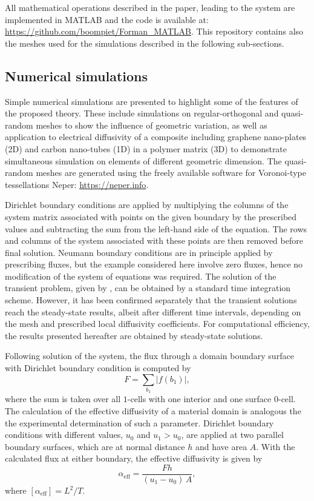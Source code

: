 \documentclass{elsarticle}
\theoremstyle{definition}
\newcommand{\abs}[1]{\left\lvert#1\right\rvert}
\begin{document}
All mathematical operations described in the paper, leading to the system  are implemented in MATLAB and the code is available at: \href{https://github.com/boompiet/Forman_MATLAB}{https://github.com/boompiet/Forman\_MATLAB}. This repository contains also the meshes used for the simulations described in the following sub-sections.

\subsection{Numerical simulations}

Simple numerical simulations are presented to highlight some of the features of the proposed theory. These include simulations on regular-orthogonal and quasi-random meshes to show the influence of geometric variation, as well as application to electrical diffusivity of a composite including graphene nano-plates (2D) and carbon nano-tubes (1D) in a polymer matrix (3D) to demonstrate simultaneous simulation on elements of different geometric dimension. The quasi-random meshes are generated using the freely available software for Voronoi-type tessellations Neper: \href{https://neper.info}{https://neper.info}.

Dirichlet boundary conditions are applied by multiplying the columns of the system matrix associated with points on the given boundary by the prescribed values and subtracting the sum from the left-hand side of the equation. The rows and columns of the system associated with these points are then removed before final solution. Neumann boundary conditions are in principle applied by prescribing fluxes, but the example considered here involve zero fluxes, hence no modification of the system of equations was required. The solution of the transient problem, given by , can be obtained by a standard time integration scheme. However, it has been confirmed separately that the transient solutions reach the steady-state results, albeit after different time intervals, depending on the mesh and prescribed local diffusivity coefficients. For computational efficiency, the results presented hereafter are obtained by steady-state solutions. 

Following solution of the system, the flux through a domain boundary surface with Dirichlet boundary condition is computed by
\begin{equation}
  F = \sum_{b_1} \abs{f(b_1)},
\end{equation}
where the sum is taken over all $1$-cells with one interior and one surface $0$-cell. The calculation of the effective diffusivity of a material domain is analogous the the experimental determination of such a parameter. Dirichlet boundary conditions with different values, $u_0$ and $u_1>u_0$, are applied at two parallel boundary surfaces, which are at normal distance $h$ and have area $A$. With the calculated flux at either boundary, the effective diffusivity is given by
\begin{equation}
  \alpha_\text{eff} = \frac{F h}{(u_1-u_0)\,A},
\end{equation}
where $[\alpha_\text{eff}]=L^2/T$.
\end{document}

